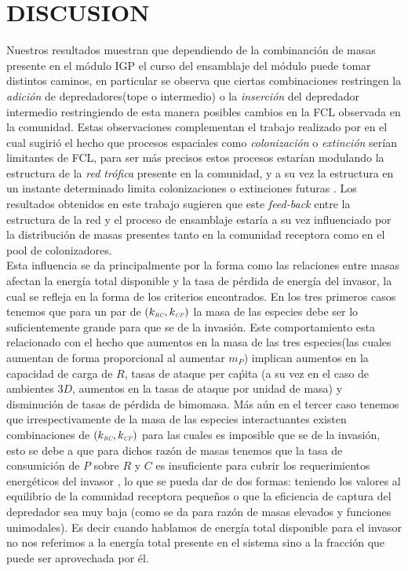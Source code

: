 \section{DISCUSION}

Nuestros resultados muestran que dependiendo de la combinanci\'on de masas presente en el m\'odulo IGP el curso del ensamblaje del m\'odulo puede tomar distintos caminos, en particular se observa que ciertas combinaciones restringen la \emph{adici\'on} de depredadores(tope o intermedio) o la \emph{inserci\'on} del depredador intermedio restringiendo de esta manera posibles cambios en la FCL observada en la comunidad. Estas observaciones complementan el trabajo realizado por \citet{holt2002food} en el cual sugiri\'o el hecho que procesos espaciales como \emph{colonizaci\'on} o \emph{extinci\'on} ser\'ian limitantes de FCL, para ser m\'as precisos estos procesos estar\'ian modulando la estructura de la \emph{red tr\'ofica} presente en la comunidad, y a su vez la estructura en un instante determinado limita colonizaciones o extinciones futuras \citep{pawar2009community,holt2002food}.  Los resultados obtenidos en este trabajo sugieren que este \emph{feed-back} entre la estructura de la red y el proceso de ensamblaje estar\'ia a su vez influenciado por la distribuci\'on de masas presentes tanto en la comunidad receptora como en el pool de colonizadores.\\

Esta influencia se da principalmente por la forma como las relaciones entre masas afectan la energ\'ia total disponible y la tasa de p\'erdida de energ\'ia del invasor, la cual se refleja en la forma de los criterios encontrados. En los tres primeros casos tenemos que para un par de $(k_{\textit{\tiny RC}},k_{\textit{\tiny CP}})$ la masa de las especies debe ser lo suficientemente grande para que se de la invasi\'on. Este comportamiento esta relacionado con el hecho que aumentos en la masa de las tres especies(las cuales aumentan de forma proporcional al aumentar $m_P$) implican aumentos en la capacidad de carga de $R$, tasas de ataque per ca\'pita (a su vez en el caso de ambientes $3D$, aumentos en la tasas de ataque por unidad de masa) y disminuci\'on de tasas de p\'erdida de bimomasa. M\'as a\'un en el tercer caso tenemos que irrespectivamente de la masa de las especies interactuantes existen combinaciones de $(k_{\textit{\tiny RC}},k_{\textit{\tiny CP}})$ para las cuales es imposible que se de la invasi\'on, esto se debe a que para dichos raz\'on de masas tenemos que la tasa de consumici\'on de $P$ sobre $R$ y $C$ es insuficiente para cubrir los requerimientos energ\'eticos del invasor , lo que se pueda dar de dos formas: teniendo los valores al equilibrio de la comunidad receptora peque\~nos o que la eficiencia de captura del depredador sea muy baja (como se da para raz\'on de masas elevados y funciones unimodales). Es decir cuando hablamos de energ\'ia total disponible para el invasor no nos referimos a la energ\'ia total presente en el sistema sino a la fracci\'on que puede ser aprovechada por \'el.\\

